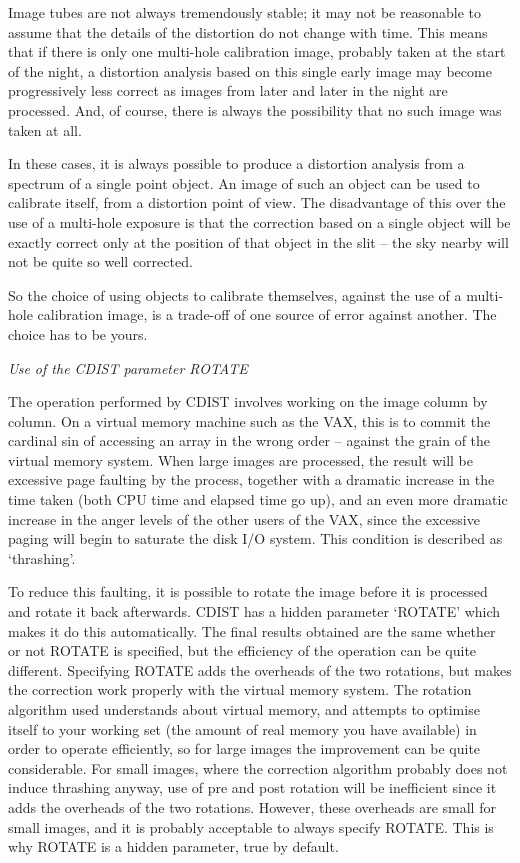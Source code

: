 Image tubes are not always tremendously stable; it may not be reasonable
to assume that the details of the distortion do not change with time.  This
means that if there is only one multi-hole calibration image, probably taken at
the start of the night, a distortion analysis based on this single early image
may become progressively less correct as images from later and later in the
night are processed.  And, of course, there is always the possibility that
no such image was taken at all.

In these cases, it is always possible to produce a distortion analysis
from a spectrum of a single point object.  An image of such an object can
be used to calibrate itself, from a distortion point of view.  The disadvantage
of this over the use of a multi-hole exposure is that the correction based
on a single object will be exactly correct only at the position of that object
in the slit -- the sky nearby will not be quite so well corrected.

So the choice of using objects to calibrate themselves, against the use
of a multi-hole calibration image, is a trade-off of one source of error
against another.  The choice has to be yours.


\goodbreak
\vspace{12pt}
{\it Use of the CDIST parameter ROTATE}

The operation performed by CDIST involves working on the image
column by column.  On a virtual memory machine such as the VAX, this
is to commit the cardinal sin of accessing an array in the wrong 
order -- against the grain of the virtual memory system.  When large
images are processed, the result will be excessive page faulting by
the process, together with a dramatic increase in the time taken
(both CPU time and elapsed time go up), and an even more dramatic
increase in the anger levels of the other users of the VAX, since the
excessive paging will begin to saturate the disk I/O system.  This
condition is described as `thrashing'.

To reduce this faulting, it is possible to rotate the image before
it is processed and rotate it back afterwards.  CDIST has a hidden 
parameter `ROTATE' which makes it do this automatically.  The final
results obtained are the same whether or not ROTATE is specified, but
the efficiency of the operation can be quite different.
Specifying ROTATE adds the overheads
of the two rotations, but makes the correction work properly with the
virtual memory system.  The rotation algorithm used understands about
virtual memory, and attempts to optimise itself to your working
set (the amount of real memory you have available) in order to operate 
efficiently, so for large images the improvement
can be quite considerable.  For small images, where the correction 
algorithm probably does not induce thrashing anyway, use of pre and post
rotation will be inefficient since it adds the overheads of the two
rotations.  However, these overheads are small for small images, and
it is probably acceptable to always specify ROTATE.  This is why ROTATE 
is a hidden parameter, true by default.  

